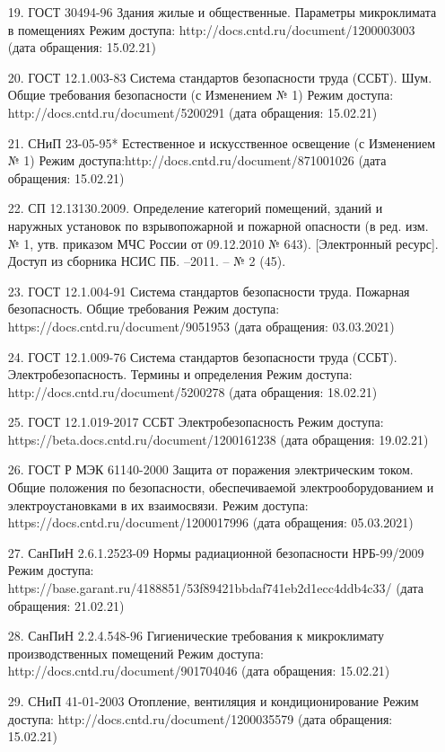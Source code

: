\begin{itemize}[leftmargin=1.6\parindent, wide]
\item[19.] ГОСТ  30494-96 Здания  жилые  и общественные.  Параметры микроклимата в помещениях Режим доступа: http://docs.cntd.ru/document/1200003003 (дата обращения: 15.02.21)
\item[20.] ГОСТ 12.1.003-83 Система стандартов безопасности труда (ССБТ). Шум. Общие  требования  безопасности  (с  Изменением  № 1) Режим  доступа: http://docs.cntd.ru/document/5200291 (дата обращения: 15.02.21)
\item[21.] СНиП  23-05-95*  Естественное  и  искусственное  освещение  (с Изменением № 1) Режим доступа:http://docs.cntd.ru/document/871001026 (дата обращения: 15.02.21)
\item[22.] СП  12.13130.2009.  Определение  категорий  помещений,  зданий  и наружных установок по взрывопожарной и пожарной опасности (в ред. изм. №  1, утв. приказом МЧС России от 09.12.2010 № 643). [Электронный ресурс]. Доступ из сборника НСИС ПБ. –2011. – № 2 (45).
\item[23.] ГОСТ 12.1.004-91  Система  стандартов  безопасности  труда.  Пожарная безопасность. Общие требования Режим доступа: https://docs.cntd.ru/document/9051953 (дата обращения: 03.03.2021)
\item[24.] ГОСТ  12.1.009-76  Система  стандартов  безопасности  труда  (ССБТ). Электробезопасность.   Термины   и   определения Режим   доступа: http://docs.cntd.ru/document/5200278 (дата обращения: 18.02.21)
\item[25.] ГОСТ 12.1.019-2017  ССБТ  Электробезопасность Режим  доступа: https://beta.docs.cntd.ru/document/1200161238 (дата обращения: 19.02.21)
\item[26.] ГОСТ Р МЭК 61140-2000 Защита  от  поражения  электрическим  током. Общие положения по безопасности, обеспечиваемой электрооборудованием и   электроустановками   в   их   взаимосвязи.   Режим   доступа: https://docs.cntd.ru/document/1200017996 (дата обращения: 05.03.2021)
\item[27.] СанПиН 2.6.1.2523-09 Нормы радиационной безопасности НРБ-99/2009 Режим доступа: https://base.garant.ru/4188851/53f89421bbdaf741eb2d1ecc4ddb4c33/ (дата обращения: 21.02.21)
\item[28.] СанПиН  2.2.4.548-96  Гигиенические  требования  к  микроклимату производственных помещений Режим доступа: http://docs.cntd.ru/document/901704046 (дата обращения: 15.02.21)
\item[29.] СНиП 41-01-2003 Отопление, вентиляция и кондиционирование Режим доступа: http://docs.cntd.ru/document/1200035579 (дата обращения: 15.02.21)

\end{itemize}
